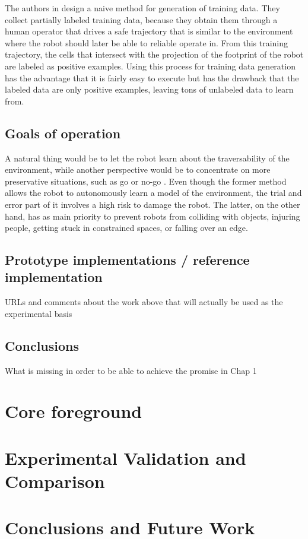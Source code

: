\documentclass[12pt,a4paper]{report}
\begin{document}
	
	
	The authors in \cite{Suger} design a naive method for generation of training data. They
	collect partially labeled training data, because they obtain them through a 
	human operator that drives a safe trajectory that is similar to the 
	environment where the robot should later be able to reliable operate in. From this 
	training trajectory, the cells that intersect with the projection of the footprint 
	of the robot are labeled as positive examples. 
	Using this process for training data generation has the advantage that it 
	is fairly easy to execute but has the drawback that the labeled data are only 
	positive examples, leaving tons of unlabeled data to learn from.
	
	
	\section{Goals of operation}
	\label{sec:bg:goals}
	
	A natural thing would be to let the robot learn about the traversability of 
	the environment, while another perspective would be to concentrate on more 
	preservative situations, such as go or no-go \cite{Hirose}. Even though the 
	former method allows the robot to autonomously learn a model of the environment, 
	the trial and error part of it involves a high risk to damage the robot. The 
	latter, on the other hand, has as main priority to prevent robots from 
	colliding with objects, injuring people, getting stuck in constrained spaces, 
	or falling over an edge.
	\\
	
	\section{Prototype implementations / reference implementation}
	\label{sec:bg:code}
	
	URLs and comments about the work above that will actually be used as 
	the experimental basis
	\\
		
	\section{Conclusions}
	\label{sec:bg:concl}
	
	What is missing in order to be able to achieve the promise in Chap 1
	
	
	\chapter{Core foreground}
	\label{sec:fg}
	
	\chapter{Experimental Validation and Comparison}
	\label{sec:exp}
	
	\chapter{Conclusions and Future Work}
	\label{sec:concl}
	
	\renewcommand{\bibname}{References}
	
	
\end{document}
